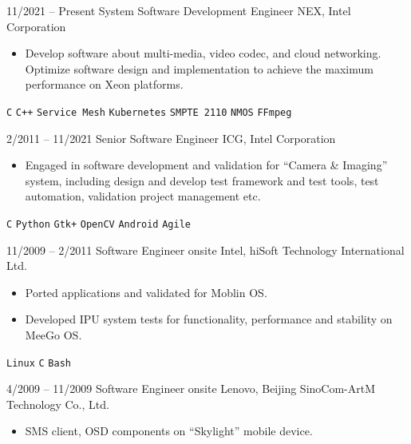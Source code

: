 \documentclass[9pt]{developercv} %
\begin{document}
\begin{entrylist}
	\entry
        {11/2021 -- Present}
		{System Software Development Engineer}
		{NEX, Intel Corporation}
		{\vspace{-10pt}
        \begin{itemize}[noitemsep,topsep=0pt,parsep=0pt,partopsep=0pt, leftmargin=-1pt]
            \item Develop software about multi-media, video codec, and cloud networking.
            Optimize software design and implementation to achieve the maximum performance on Xeon platforms.
        \end{itemize} 
        \texttt{C} \slashsep \texttt{C++} \slashsep \texttt{Service Mesh} \slashsep \texttt{Kubernetes} \slashsep \texttt{SMPTE 2110}  \slashsep \texttt{NMOS} \slashsep \texttt{FFmpeg}}
	\entry
		{2/2011 -- 11/2021}
		{Senior Software Engineer}
		{ICG, Intel Corporation}
		{\vspace{-10pt}
        \begin{itemize}[noitemsep,topsep=0pt,parsep=0pt,partopsep=0pt, leftmargin=-1pt]
            \item Engaged in software development and validation for “Camera \& Imaging” system, including design and develop test framework and test tools, test automation, validation project management etc.
        \end{itemize} 
        \texttt{C} \slashsep \texttt{Python} \slashsep \texttt{Gtk+} \slashsep \texttt{OpenCV} \slashsep \texttt{Android} \slashsep \texttt{Agile}}
    \entry
		{11/2009 -- 2/2011}
		{Software Engineer}
		{onsite Intel, hiSoft Technology International Ltd.}
		{\vspace{-10pt}
        \begin{itemize}[noitemsep,topsep=0pt,parsep=0pt,partopsep=0pt, leftmargin=-1pt]
            \item Ported applications and validated for Moblin OS.
            \item Developed IPU system tests for functionality, performance and stability on MeeGo OS.
        \end{itemize}
        \texttt{Linux} \slashsep \texttt{C} \slashsep \texttt{Bash}}
	\entry
		{4/2009 -- 11/2009}
		{Software Engineer}
		{onsite Lenovo, Beijing SinoCom-ArtM Technology Co., Ltd.}
		{\vspace{-10pt}
        \begin{itemize}[noitemsep,topsep=0pt,parsep=0pt,partopsep=0pt, leftmargin=-1pt]
            \item SMS client, OSD components on “Skylight” mobile device.

\end{itemize}}
\end{entrylist}
\end{document}
